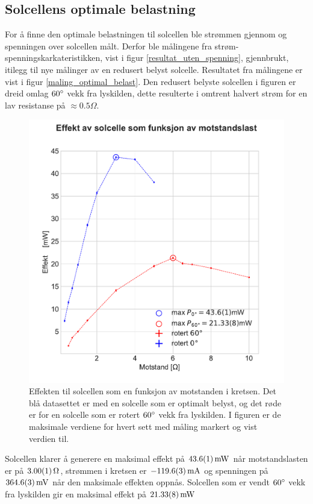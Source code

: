 \documentclass[%
 reprint,
 amsmath,amssymb,
 aps,
 norsk,
 booktabs
]{revtex4-1}
\begin{document}
\subsection{Solcellens optimale belastning}
For å finne den optimale belastningen til solcellen ble strømmen gjennom og spenningen over solcellen målt. Derfor ble målingene fra strøm-spenningskarkateristikken, vist i figur \vref{resultat_uten_spenning}, gjennbrukt, itilegg til nye målinger av en redusert belyst solcelle. Resultatet fra målingene er vist i figur \vref{maling_optimal_belast}. Den redusert belyste solcellen i figuren er dreid omlag $60\degree$ vekk fra lyskilden, dette resulterte i omtrent halvert strøm for en lav resistanse på $\approx 0.5\Omega$.
\begin{figure}
  \centering
  \includegraphics[scale=0.47]{effekt.pdf}
  \caption{Effekten til solcellen som en funksjon av motstanden i kretsen. Det blå datasettet er med en solcelle som er optimalt belyst, og det røde er for en solcelle som er rotert $60\degree$ vekk fra lyskilden. I figuren er de maksimale verdiene for hvert sett med måling markert og vist verdien til.}
  \label{maling_optimal_belast}
\end{figure}
Solcellen klarer å generere en maksimal effekt på $\SI{43.6\pm0.1}{\milli\watt}$ når motstandslasten er på $\SI{3.00\pm0.01}{\Omega}$, strømmen i kretsen er $-\SI{119.6\pm0.3}{\milli\ampere}$ og spenningen på $\SI{364.6\pm0.3}{\milli\volt}$ når den maksimale effekten oppnås. Solcellen som er vendt $60\degree$ vekk fra lyskilden gir en maksimal effekt på $\SI{21.33\pm0.08}{\milli\watt}$
\end{document}
